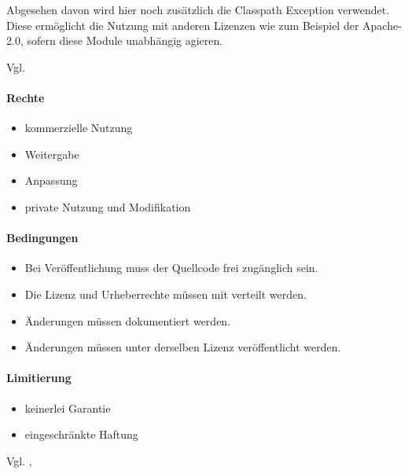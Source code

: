 Abgesehen davon wird hier noch zusätzlich die Classpath Exception verwendet.
Diese ermöglicht die Nutzung mit anderen Lizenzen wie zum Beispiel der Apache-2.0,
sofern diese Module unabhängig agieren.

Vgl. \cite{gnu-classPath}

\paragraph{Rechte}
\begin{itemize}
    \item kommerzielle Nutzung
    \item Weitergabe
    \item Anpassung
    \item private Nutzung und Modifikation
\end{itemize}
\paragraph{Bedingungen}
\begin{itemize}
    \item Bei Veröffentlichung muss der Quellcode frei zugänglich sein.
    \item Die Lizenz und Urheberrechte müssen mit verteilt werden.
    \item Änderungen müssen dokumentiert werden.
    \item Änderungen müssen unter derselben Lizenz veröffentlicht werden.
\end{itemize}

\paragraph{Limitierung}
\begin{itemize}
    \item keinerlei Garantie
    \item eingeschränkte Haftung
\end{itemize}
Vgl. \cite{choosealicense-com}, \cite{gnu-why-upgrade-gplv3}



